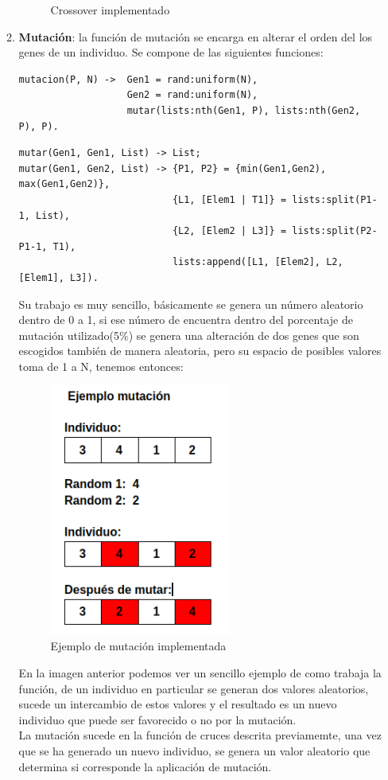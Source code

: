 \documentclass[12pt,a4paper]{article}
\begin{document}
\begin{enumerate}
\begin{enumerate}
\begin{figure}[htp]
\caption{Crossover implementado}
\label{foto}
\end{figure}
\newpage
\item \textbf{Mutación}: la función de mutación se encarga en alterar el orden del los genes de un individuo. Se compone de las siguientes funciones:
\begin{verbatim}
mutacion(P, N) ->  Gen1 = rand:uniform(N),
                   Gen2 = rand:uniform(N),
                   mutar(lists:nth(Gen1, P), lists:nth(Gen2, P), P).
\end{verbatim}
\begin{verbatim}
mutar(Gen1, Gen1, List) -> List;
mutar(Gen1, Gen2, List) -> {P1, P2} = {min(Gen1,Gen2), max(Gen1,Gen2)},
                           {L1, [Elem1 | T1]} = lists:split(P1-1, List),
                           {L2, [Elem2 | L3]} = lists:split(P2-P1-1, T1), 
                           lists:append([L1, [Elem2], L2, [Elem1], L3]).
\end{verbatim}
 Su trabajo es muy sencillo, básicamente se genera un número aleatorio dentro de 0 a 1, si ese número de encuentra dentro del porcentaje de mutación utilizado(5\%) se genera una alteración de dos genes que son escogidos también de manera aleatoria, pero su espacio de posibles valores toma de 1 a N, tenemos entonces: \\
 \begin{figure}[htp]
\centering
\includegraphics[width=6cm]{imagenes/g3.png} 
\caption{Ejemplo de mutación implementada}
\label{foto}
\end{figure}
\newpage
En la imagen anterior podemos ver un sencillo ejemplo de como trabaja la función, de un individuo en particular se generan dos valores aleatorios, sucede un intercambio de estos valores y el resultado es un nuevo individuo que puede ser favorecido o no por la mutación. \\
La mutación sucede en la función de cruces descrita previamemte, una vez que se ha generado un nuevo individuo, se genera un valor aleatorio que determina si corresponde la aplicación de mutación. 


\end{enumerate}
\end{enumerate}
\end{document}
